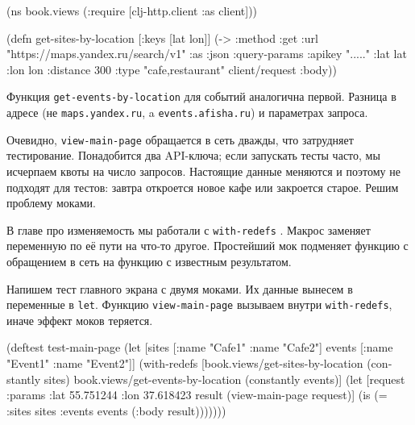 \else

\begin{english}
  \begin{clojure}
(ns book.views
  (:require [clj-http.client :as client]))

(defn get-sites-by-location
  [{:keys [lat lon]}]
  (-> {:method :get
       :url "https://maps.yandex.ru/search/v1"
       :as :json
       :query-params {:apikey "....."
                      :lat lat :lon lon :distance 300
                      :type "cafe,restaurant"}}
      client/request
      :body))
  \end{clojure}
\end{english}

\fi

Функция \verb|get-events-by-location| для событий аналогична первой. Разница в
адресе (не \verb|maps.yandex.ru|, a \verb|events.afisha.ru|) и параметрах
запроса.

Очевидно, \verb|view-main-page| обращается в сеть дважды, что затрудняет
тестирование. Понадобится два API-ключа; если запускать тесты часто, мы
исчерпаем квоты на число запросов. Настоящие данные меняются и поэтому не
подходят для тестов: завтра откроется новое кафе или закроется старое. Решим
проблему моками.


В главе про изменяемость мы работали с \verb|with-redefs| .
Макрос заменяет переменную по её пути на что-то другое. Простейший мок подменяет
функцию с обращением в сеть на функцию с известным результатом.

Напишем тест главного экрана с двумя моками. Их данные вынесем в переменные в
\verb|let|. Функцию \verb|view-main-page| вызываем  внутри
\verb|with-redefs|, иначе эффект моков теряется.

\ifx\devicetype\mobile

\begin{english}
  \begin{clojure}
(deftest test-main-page
  (let [sites [{:name "Cafe1"}
               {:name "Cafe2"}]
        events [{:name "Event1"}
                {:name "Event2"}]]
    (with-redefs
      [book.views/get-sites-by-location
       (constantly sites)
       book.views/get-events-by-location
       (constantly events)]
      (let [request
            {:params {:lat 55.751244
                      :lon 37.618423}}
            result
            (view-main-page request)]
        (is (= {:sites sites
               :events events}
               (:body result)))))))
  \end{clojure}
\end{english}

